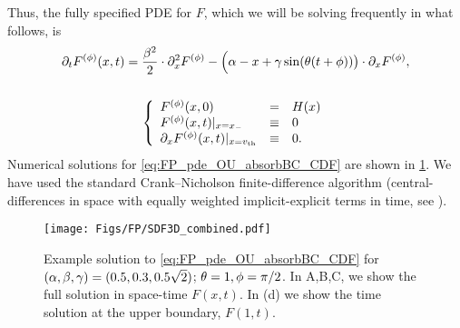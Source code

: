 Thus, the fully specified PDE for $F$, which we will be solving frequently in what
follows, is
\begin{equation}
\begin{gathered}
	{\partial}_t F^{(\phi)}(x,t) =
					\frac{\beta^2 }{2}\cdot {\partial}^2_x F^{(\phi)} -  
					\Big(\alpha- x + {\gamma } \sin({ \theta} (t + \phi))\big)  \cdot {\partial}_x F^{(\phi)},
	\\
	\\
	\left\{ \begin{array}{lcl}
	 F^{(\phi)}(x,0) &=& H(x)
	\\
	F^{(\phi)}(x,t) |_{x={ x_{-} }} &\equiv& 0 
	\\
	{\partial}_x F^{(\phi)}(x,t) |_{x={ v_{\textrm{th} } }} &\equiv& 0.
	\end{array} \right.
\label{eq:FP_pde_OU_absorbBC_CDF}
\end{gathered}
\end{equation}
Numerical solutions for \cref{eq:FP_pde_OU_absorbBC_CDF} are shown in
\cref{fig:FP_pde_OU_absorbBC_CDF}. We have used the standard Crank--Nicholson
finite-difference algorithm (central-differences in space with equally weighted
implicit-explicit terms in time, see \cite{Karniadakis2003}). 

\begin{figure}[h]
\begin{center}
\texttt{[image: Figs/FP/SDF3D\_combined.pdf]} 
\caption{Example solution to \cref{eq:FP_pde_OU_absorbBC_CDF} for
$(\alpha,\beta,{\gamma }) = (0.5, 0.3, 0.5\sqrt{2})$; ${ \theta}= 1, \phi = \pi / 2$.
In A,B,C, we show the full solution in space-time $F(x,t)$. In (d) we show
the time solution at the upper boundary, $F(1,t)$.} 
\label{fig:FP_pde_OU_absorbBC_CDF} 
\end{center}
\end{figure}

